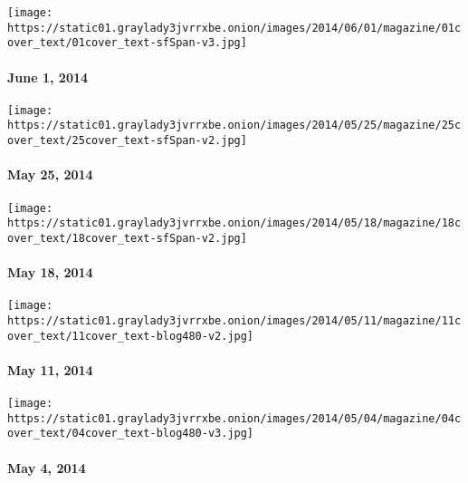 \href{http://www.nytimes3xbfgragh.onion/indexes/2014/06/01/magazine/index.html}{}

\texttt{[image: https://static01.graylady3jvrrxbe.onion/images/2014/06/01/magazine/01cover\_text/01cover\_text-sfSpan-v3.jpg]}

\hypertarget{june-1-2014}{%
\paragraph{June 1, 2014}\label{june-1-2014}}

\href{http://www.nytimes3xbfgragh.onion/indexes/2014/05/25/magazine/index.html}{}

\texttt{[image: https://static01.graylady3jvrrxbe.onion/images/2014/05/25/magazine/25cover\_text/25cover\_text-sfSpan-v2.jpg]}

\hypertarget{may-25-2014}{%
\paragraph{May 25, 2014}\label{may-25-2014}}

\href{http://www.nytimes3xbfgragh.onion/indexes/2014/05/18/magazine/index.html}{}

\texttt{[image: https://static01.graylady3jvrrxbe.onion/images/2014/05/18/magazine/18cover\_text/18cover\_text-sfSpan-v2.jpg]}

\hypertarget{may-18-2014}{%
\paragraph{May 18, 2014}\label{may-18-2014}}

\href{http://www.nytimes3xbfgragh.onion/indexes/2014/05/11/magazine/index.html}{}

\texttt{[image: https://static01.graylady3jvrrxbe.onion/images/2014/05/11/magazine/11cover\_text/11cover\_text-blog480-v2.jpg]}

\hypertarget{may-11-2014}{%
\paragraph{May 11, 2014}\label{may-11-2014}}

\href{http://www.nytimes3xbfgragh.onion/indexes/2014/05/04/magazine/index.html}{}

\texttt{[image: https://static01.graylady3jvrrxbe.onion/images/2014/05/04/magazine/04cover\_text/04cover\_text-blog480-v3.jpg]}

\hypertarget{may-4-2014}{%
\paragraph{May 4, 2014}\label{may-4-2014}}

